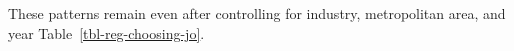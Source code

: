 \documentclass[
  12pt]{article}
\theoremstyle{definition}
\theoremstyle{remark}
\begin{document}
These patterns remain even after controlling for industry, metropolitan
area, and year Table~\ref{tbl-reg-choosing-jo}.

\begin{figure}

\begin{minipage}{0.50\linewidth}



\end{minipage}%
%
\begin{minipage}{0.50\linewidth}



\end{minipage}
\end{figure}
\end{document}
